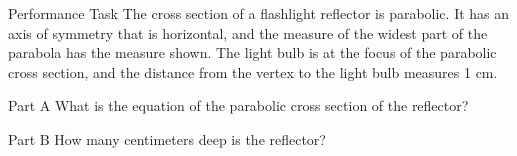 \documentclass{article}
\newenvironment{practice}[2]{}{}        %
\newcommand{\answer}[1]{}               %
\newcommand{\placeholder}[2]{}          %
\begin{document}
\begin{practice}{27}{3}
Performance Task The cross section of a flashlight reflector is parabolic. It has an axis of symmetry that is horizontal, and the measure of the widest part of the parabola has the measure shown. The light bulb is at the focus of the parabolic cross section, and the distance from the vertex to the light bulb measures 1 cm.
\placeholder{illustration}{Cutaway flashlight with teal case, orange batteries at right, gray parabolic reflector opening to left, light bulb at focus on its horizontal axis. Vertical double-arrow dimension at left opening is 6 cm.}
Part A What is the equation of the parabolic cross section of the reflector?
\answer{(x=-\frac{1}{4}y^2)}
Part B How many centimeters deep is the reflector?
\answer{(\frac{9}{4}) cm deep}
\end{practice}
\end{document}
